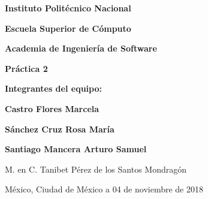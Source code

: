 \vspace{1cm}
\centerline{\Large \bf Instituto Politécnico Nacional}\vspace{.3cm}
\centerline{\Large \bf Escuela Superior de Cómputo}\vspace{.3cm}
\centerline{\Large \bf Academia de Ingeniería de Software}
\vspace{3cm}
\centerline{\Large \bf Práctica 2}


\vspace{2cm}
\centerline{\Large  \bf Integrantes del equipo:}
\vspace{1cm}
\centerline{\Large  \bf Castro Flores Marcela}
\vspace{.2cm}
\centerline{\Large  \bf Sánchez Cruz Rosa María}
\vspace{.2cm}
\centerline{\Large  \bf Santiago Mancera Arturo Samuel}

\vspace{2cm}

\centerline{\Large  M. en C. Tanibet Pérez de los Santos Mondragón }
 
\vspace{2cm}
\begin{center}
{\large  M\'{e}xico, Ciudad de México a 04 de noviembre de 2018}
\end{center}
